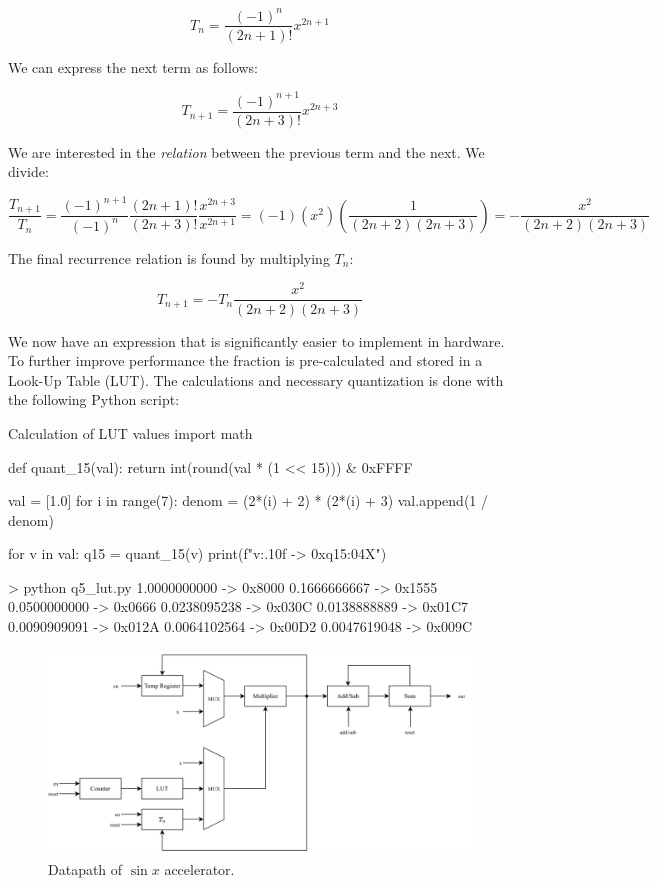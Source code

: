 \documentclass[../main.tex]{subfiles}
\begin{document}
$$
T_n = \frac{(-1)^n}{(2n + 1)!} x^{2n + 1}
$$

We can express the next term as follows:

$$
T_{n+1} = \frac{(-1)^{n+1}}{(2n + 3)!} x^{2n + 3}
$$

We are interested in the \textit{relation} between the previous term and the next. We divide:

$$
\frac{T_{n+1}}{T_n} = \frac{(-1)^{n+1}}{(-1)^n} \frac{(2n +1)!}{(2n + 3)!} \frac{x^{2n + 3}}{x^{2n + 1}} = (-1) (x^2) \left( \frac{1}{(2n + 2)(2n + 3)} \right) = - \frac{x^2}{(2n + 2)(2n + 3)}
$$

The final recurrence relation is found by multiplying $T_n$:

$$
T_{n + 1} = - T_n \frac{x^2}{(2n + 2)(2n + 3)}
$$

We now have an expression that is significantly easier to implement in hardware. To further improve performance the fraction is pre-calculated and stored in a Look-Up Table (LUT). The calculations and necessary quantization is done with the following Python script:

\begin{svpython}{Calculation of LUT values}
import math

def quant_15(val):
    return int(round(val * (1 << 15))) & 0xFFFF

val = [1.0]
for i in range(7):
    denom = (2*(i) + 2) * (2*(i) + 3)
    val.append(1 / denom)

for v in val:
    q15 = quant_15(v)
    print(f"{v:.10f} -> 0x{q15:04X}")
\end{svpython}

\begin{textcode}{> python q5\_lut.py}
1.0000000000 -> 0x8000
0.1666666667 -> 0x1555
0.0500000000 -> 0x0666
0.0238095238 -> 0x030C
0.0138888889 -> 0x01C7
0.0090909091 -> 0x012A
0.0064102564 -> 0x00D2
0.0047619048 -> 0x009C
\end{textcode}

\newpage

\begin{figure}[h]
    \centering
    \includegraphics[width=\linewidth]{assets/q5_dp.png}
    \caption{Datapath of $\sin x$ accelerator.}
    \label{fig:q5_dp}
\end{figure}
\end{document}
